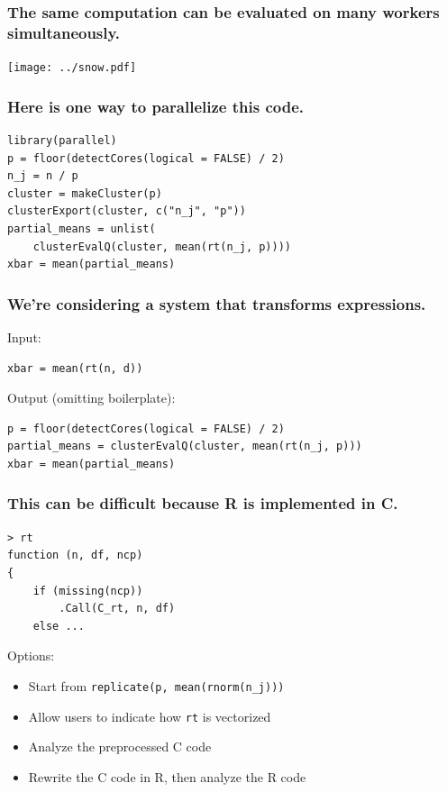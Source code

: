 \documentclass{beamer}
\begin{document}
\begin{frame}

    \frametitle{The same computation can be evaluated on many workers
    simultaneously.}

\centerline{\texttt{[image: ../snow.pdf]}}

\end{frame}
\begin{frame}[fragile]

    \frametitle{Here is one way to parallelize this code.}

\begin{verbatim}
library(parallel)
p = floor(detectCores(logical = FALSE) / 2)
n_j = n / p
cluster = makeCluster(p)
clusterExport(cluster, c("n_j", "p"))
partial_means = unlist(
    clusterEvalQ(cluster, mean(rt(n_j, p))))
xbar = mean(partial_means)
\end{verbatim}

\end{frame}
\begin{frame}[fragile]

    \frametitle{We're considering a system that transforms expressions.}

    Input:

\begin{verbatim}
xbar = mean(rt(n, d))
\end{verbatim}

    Output (omitting boilerplate):

\begin{verbatim}
p = floor(detectCores(logical = FALSE) / 2)
partial_means = clusterEvalQ(cluster, mean(rt(n_j, p)))
xbar = mean(partial_means)
\end{verbatim}

\end{frame}
\begin{frame}[fragile]

    \frametitle{This can be difficult because R is implemented in C.}

\begin{verbatim}
> rt
function (n, df, ncp)
{
    if (missing(ncp))
        .Call(C_rt, n, df)
    else ...
\end{verbatim}

\pause

    Options:

    \begin{itemize}
        \item Start from \texttt{replicate(p, mean(rnorm(n\_j)))}
        \item Allow users to indicate how \texttt{rt} is vectorized
        \item Analyze the preprocessed C code
        \item Rewrite the C code in R, then analyze the R code
    \end{itemize}

\end{frame}
\end{document}
